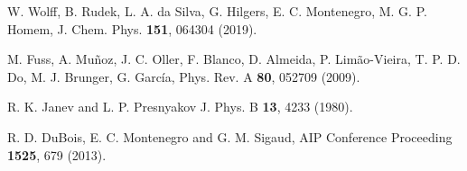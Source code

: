 \documentclass[10pt,showpacs,twocolumn]{revtex4}
\begin{document}
\begin{thebibliography}{}
W. Wolff, B. Rudek, L. A. da Silva, G. Hilgers, E. C. Montenegro, 
M. G. P. Homem,
J. Chem. Phys. \textbf{151}, 064304 (2019).

M. Fuss, A. Muñoz, J. C. Oller, F. Blanco, D. Almeida, P. Limão-Vieira, 
T. P. D. Do, M. J. Brunger, G. Garc\'{i}a,
Phys. Rev. A \textbf{80}, 052709 (2009).

R. K. Janev and L. P. Presnyakov 
J. Phys. B \textbf{13}, 4233 (1980).

R. D. DuBois, E. C. Montenegro and G. M. Sigaud,
AIP Conference Proceeding \textbf{1525}, 679 (2013).

\end{thebibliography}
\end{document}
